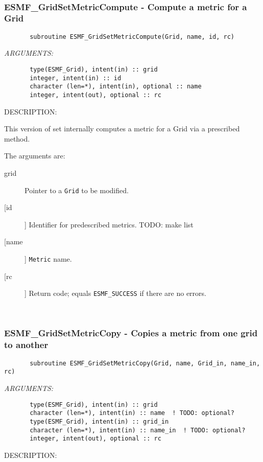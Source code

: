  
\mbox{}\hrulefill\ 
 
\subsubsection{ESMF\_GridSetMetricCompute - Compute a metric for a Grid}


 
\begin{verbatim}       subroutine ESMF_GridSetMetricCompute(Grid, name, id, rc)\end{verbatim}{\em ARGUMENTS:}
\begin{verbatim}       type(ESMF_Grid), intent(in) :: grid
       integer, intent(in) :: id
       character (len=*), intent(in), optional :: name
       integer, intent(out), optional :: rc\end{verbatim}
{\sf DESCRIPTION:\\ }


       This version of set internally computes a metric for a Grid via a
       prescribed method.
  
       The arguments are:
       \begin{description}
       \item[grid]
            Pointer to a {\tt Grid} to be modified.
       \item[[id]]
            Identifier for predescribed metrics.  TODO: make list
       \item [[name]]
             {\tt Metric} name.
       \item[[rc]]
            Return code; equals {\tt ESMF\_SUCCESS} if there are no errors.
       \end{description}
   
 
\mbox{}\hrulefill\ 
 
\subsubsection{ESMF\_GridSetMetricCopy - Copies a metric from one grid to another}


 
\begin{verbatim}       subroutine ESMF_GridSetMetricCopy(Grid, name, Grid_in, name_in, rc)\end{verbatim}{\em ARGUMENTS:}
\begin{verbatim}       type(ESMF_Grid), intent(in) :: grid
       character (len=*), intent(in) :: name  ! TODO: optional?
       type(ESMF_Grid), intent(in) :: grid_in
       character (len=*), intent(in) :: name_in  ! TODO: optional?
       integer, intent(out), optional :: rc\end{verbatim}
{\sf DESCRIPTION:\\ }


